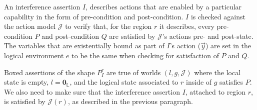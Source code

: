 An interference assertion $I$, describes actions that are enabled by a particular capability in the form of pre-condition and post-condition. $I$ is checked against the action model $\mathcal{J}$ to verify that, for the region $r$ it describes, every pre-condition $P$ and post-condition $Q$ are satisfied by $\mathcal{J}$'s actions pre- and post-state. The variables that are existentially bound as part of $I$'s action ($\vec{y}$) are set in the logical environment $e$ to be the same when checking for satisfaction of $P$ and $Q$.

Boxed assertions of the shape $\boxed{P}^r_I$ are true of worlds $(l, g, \mathcal{J})$ where the local state is empty, $l = \mathbf{0}_\mathbb{L}$, and the logical state associated to $r$ inside of $g$ satisfies $P$. We also need to make sure that the interference assertion $I$, attached to region $r$, is satisfied by $\mathcal{J}(r)$, as described in the previous paragraph.

